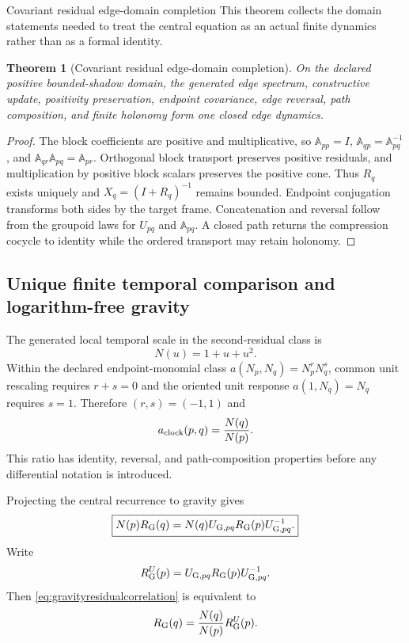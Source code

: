 \documentclass[11pt]{article}
\numberwithin{equation}{section}
\newtheorem{theorem}[definition]{Theorem}
\theoremstyle{remark}
\begin{document}
\begin{proofguide}{Covariant residual edge-domain completion}
This theorem collects the domain statements needed to treat the central equation as an actual finite dynamics rather than as a formal identity.
\end{proofguide}
\begin{theorem}[Covariant residual edge-domain completion]
On the declared positive bounded-shadow domain, the generated edge spectrum, constructive update, positivity preservation, endpoint covariance, edge reversal, path composition, and finite holonomy form one closed edge dynamics.
\end{theorem}
\begin{proof}
The block coefficients are positive and multiplicative, so $\mathbb A_{pp}=I$, $\mathbb A_{qp}=\mathbb A_{pq}^{-1}$, and $\mathbb A_{qr}\mathbb A_{pq}=\mathbb A_{pr}$. Orthogonal block transport preserves positive residuals, and multiplication by positive block scalars preserves the positive cone. Thus $R_q$ exists uniquely and $X_q=(I+R_q)^{-1}$ remains bounded. Endpoint conjugation transforms both sides by the target frame. Concatenation and reversal follow from the groupoid laws for $U_{pq}$ and $\mathbb A_{pq}$. A closed path returns the compression cocycle to identity while the ordered transport may retain holonomy.
\end{proof}

\subsection{Unique finite temporal comparison and logarithm-free gravity}
The generated local temporal scale in the second-residual class is
\begin{equation}
N(u)=1+u+u^2.
\label{eq:temporalscaleN}
\end{equation}
Within the declared endpoint-monomial class $a(N_p,N_q)=N_p^rN_q^s$, common unit rescaling requires $r+s=0$ and the oriented unit response $a(1,N_q)=N_q$ requires $s=1$.  Therefore $(r,s)=(-1,1)$ and
\begin{equation}
a_{\rm clock}(p,q)=\frac{N(q)}{N(p)}.
\label{eq:uniquegravityratio}
\end{equation}
This ratio has identity, reversal, and path-composition properties before any differential notation is introduced.

Projecting the central recurrence to gravity gives
\begin{equation}
\boxed{N(p)R_{\rm G}(q)=N(q)U_{{\rm G},pq}R_{\rm G}(p)U_{{\rm G},pq}^{-1}.}
\label{eq:gravityresidualcorrelation}
\end{equation}
Write
\begin{equation}
R_{\rm G}^{U}(p)=U_{{\rm G},pq}R_{\rm G}(p)U_{{\rm G},pq}^{-1}.
\end{equation}
Then \eqref{eq:gravityresidualcorrelation} is equivalent to
\begin{equation}
R_{\rm G}(q)=\frac{N(q)}{N(p)}R_{\rm G}^{U}(p).
\label{eq:gravityratioform}
\end{equation}
\end{document}
